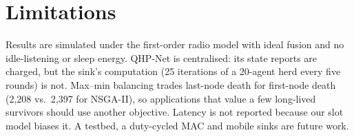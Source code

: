 \documentclass[conference]{IEEEtran}
\begin{document}
\begin{table}[t]
\caption{Mean FND over 15 paired topologies per cell (lossy). Columns: field side $W$ (m) / number of nodes $N$.}
\label{tab:sweep}
\centering
{}
\end{table}

\section{Limitations}
Results are simulated under the first-order radio model with ideal fusion and no idle-listening or sleep energy. QHP-Net is centralised: its state reports are charged, but the sink's computation (25 iterations of a 20-agent herd every five rounds) is not. Max--min balancing trades last-node death for first-node death (2,208 vs.\ 2,397 for NSGA-II), so applications that value a few long-lived survivors should use another objective. Latency is not reported because our slot model biases it. A testbed, a duty-cycled MAC and mobile sinks are future work.

\end{document}
